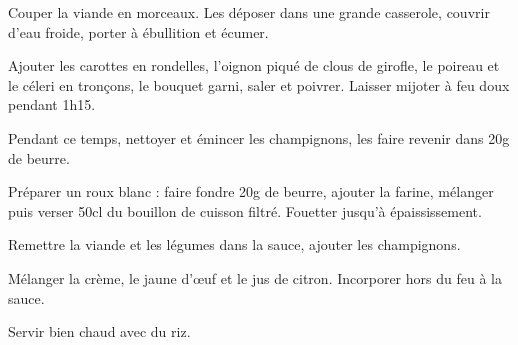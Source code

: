 \begin{nouvellerecette}


Couper la viande en morceaux. Les déposer dans une grande casserole, couvrir d’eau froide, porter à ébullition et écumer.

Ajouter les carottes en rondelles, l’oignon piqué de clous de girofle, le poireau et le céleri en tronçons, le bouquet garni, saler et poivrer. Laisser mijoter à feu doux pendant 1h15.

Pendant ce temps, nettoyer et émincer les champignons, les faire revenir dans 20g de beurre.

Préparer un roux blanc : faire fondre 20g de beurre, ajouter la farine, mélanger puis verser 50cl du bouillon de cuisson filtré. Fouetter jusqu’à épaississement.

Remettre la viande et les légumes dans la sauce, ajouter les champignons.

Mélanger la crème, le jaune d’œuf et le jus de citron. Incorporer hors du feu à la sauce.

Servir bien chaud avec du riz.


\end{nouvellerecette}
